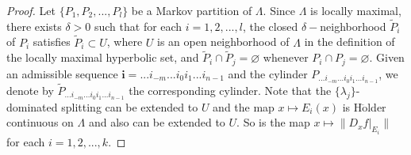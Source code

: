 \documentclass[11pt,a4paper]{amsart}
\theoremstyle{plain}
\theoremstyle{remark}
\begin{document}
	
	\begin{proof}
		Let $\{P_{1},P_{2},...,P_{l}\}$ be a Markov partition of $\Lambda$. Since $\Lambda$ is locally maximal, there exists $\delta>0$ such that for each $i=1,2,...,l$, the closed $\delta-$neighborhood $\tilde{P}_{i}$ of $P_{i}$ satisfies $\tilde{P}_{i}\subset U$, where $U$ is an open neighborhood of $\Lambda$  in the definition of the locally maximal hyperbolic set, and $\tilde{P}_{i}\cap \tilde{P}_{j}=\varnothing$ whenever $P_{i}\cap P_{j}=\varnothing$. Given an admissible sequence $\mathbf{i}=...i_{-m}...i_{0}i_{1}...i_{n-1}$ and the cylinder $P_{...i_{-m}...i_{0}i_{1}...i_{n-1}}$, we denote by $\tilde{P}_{...i_{-m}...i_{0}i_{1}...i_{n-1}}$ the corresponding cylinder. Note that the $\{\lambda_{j}\}$-dominated splitting can be extended to $U$ and the map $x\mapsto E_{i}(x)$ is H$\ddot{\text{o}}$lder continuous on $\Lambda$ and also can be extended to $U$. So is the map $x\mapsto \|D_{x}f|_{E_{i}}\|$ for each $i=1,2,...,k.$
		

\end{proof}
\end{document}
